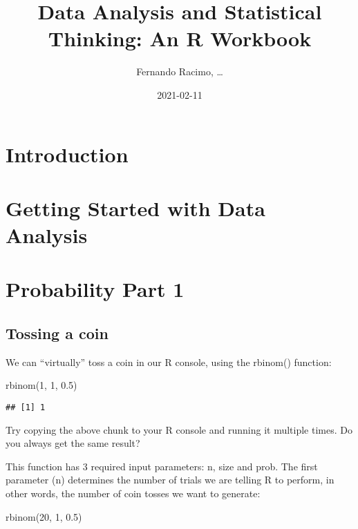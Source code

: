 \documentclass[
]{book}
\title{Data Analysis and Statistical Thinking: An R Workbook}
\author{Fernando Racimo, \ldots{}}
\date{2021-02-11}
\newenvironment{Shaded}{\begin{snugshade}}{\end{snugshade}}
\newcommand{\DecValTok}[1]{\textcolor[rgb]{0.00,0.00,0.81}{#1}}
\newcommand{\FloatTok}[1]{\textcolor[rgb]{0.00,0.00,0.81}{#1}}
\newcommand{\FunctionTok}[1]{\textcolor[rgb]{0.00,0.00,0.00}{#1}}
\newcommand{\NormalTok}[1]{#1}
\begin{document}
\maketitle

{
\setcounter{tocdepth}{1}
\tableofcontents
}
\hypertarget{introduction}{%
\chapter{Introduction}\label{introduction}}

\hypertarget{intro}{%
\chapter{Getting Started with Data Analysis}\label{intro}}

\hypertarget{prob1}{%
\chapter{Probability Part 1}\label{prob1}}

\hypertarget{tossing-a-coin}{%
\section{Tossing a coin}\label{tossing-a-coin}}

We can ``virtually'' toss a coin in our R console, using the rbinom() function:

\begin{Shaded}
\begin{Highlighting}[]
\FunctionTok{rbinom}\NormalTok{(}\DecValTok{1}\NormalTok{, }\DecValTok{1}\NormalTok{, }\FloatTok{0.5}\NormalTok{)}
\end{Highlighting}
\end{Shaded}

\begin{verbatim}
## [1] 1
\end{verbatim}

Try copying the above chunk to your R console and running it multiple times. Do you always get the same result?

This function has 3 required input parameters: n, size and prob. The first parameter (n) determines the number of trials we are telling R to perform, in other words, the number of coin tosses we want to generate:

\begin{Shaded}
\begin{Highlighting}[]
\FunctionTok{rbinom}\NormalTok{(}\DecValTok{20}\NormalTok{, }\DecValTok{1}\NormalTok{, }\FloatTok{0.5}\NormalTok{)}
\end{Highlighting}
\end{Shaded}
\end{document}
